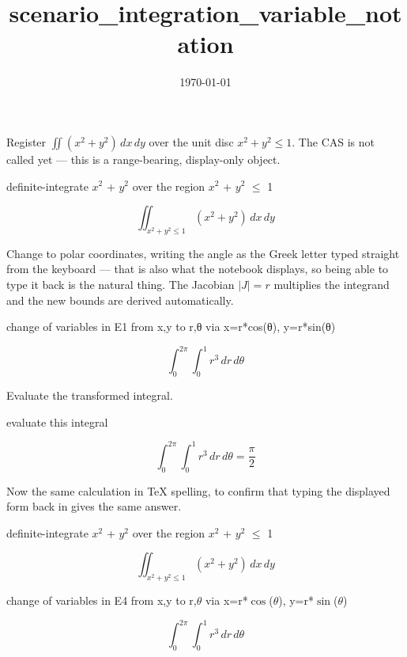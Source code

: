 \documentclass[dvipdfmx]{article}
\title{scenario\_integration\_variable\_notation}
\date{\today}
\begin{document}
\maketitle

Register $\iint(x^2+y^2)\,dx\,dy$ over the unit disc $x^2+y^2\le1$. The CAS is not called yet — this is a range-bearing, display-only object.

definite-integrate $x^2$ + $y^2$ over the region $x^2$ + $y^2$ $\le$ 1

\begin{equation}
  \iint_{x^2+y^2 \le 1} (x^2 + y^2) \, dx \, dy
  \label{eq:E1}
\end{equation}

Change to polar coordinates, writing the angle as the Greek letter typed straight from the keyboard — that is also what the notebook displays, so being able to type it back is the natural thing. The Jacobian $|J|=r$ multiplies the integrand and the new bounds are derived automatically.

change of variables in E1 from x,y to r,θ via x=r*cos(θ), y=r*sin(θ)

\begin{equation}
  \int_{0}^{2\pi} \int_{0}^{1} r^3 \, dr \, d\theta
  \label{eq:E2}
\end{equation}

Evaluate the transformed integral.

evaluate this integral

\begin{equation}
  \int_{0}^{2\pi} \int_{0}^{1} r^3 \, dr \, d\theta = \frac{\pi}{2}
  \label{eq:E3}
\end{equation}

Now the same calculation in TeX spelling, to confirm that typing the displayed form back in gives the same answer.

definite-integrate $x^2$ + $y^2$ over the region $x^2$ + $y^2$ $\le$ 1

\begin{equation}
  \iint_{x^2+y^2 \le 1} (x^2 + y^2) \, dx \, dy
  \label{eq:E4}
\end{equation}

change of variables in E4 from x,y to r,$\theta$ via x=r*$\cos$($\theta$), y=r*$\sin$($\theta$)

\begin{equation}
  \int_{0}^{2\pi} \int_{0}^{1} r^3 \, dr \, d\theta
  \label{eq:E5}
\end{equation}
\end{document}
